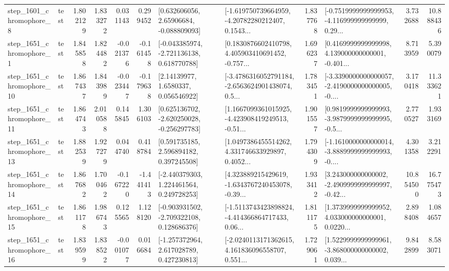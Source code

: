 \begin{tabular}{llrrrrllrlrr}
  step\_1601\_chromophore\_8 &      test &      1.802129 &    1.833272 &      0.031143 &  0.299452 &     [0.632606056, 2.65906684, -0.088809093] &  [-1.619750739664959, -4.20782280212407, 0.1543... &       1.837768 &  [-0.7519999999999953, -4.116999999999999, 0.29... &            3.732688 &         10.888436 \\
  step\_1651\_chromophore\_1 &      test &      1.845858 &    1.824482 &     -0.021376 & -0.161458 &   [-0.043385974, -2.721136138, 0.618770788] &  [0.1830876602410798, 4.405903410691452, -0.757... &       1.696237 &  [0.4169999999999998, 4.139000000000001, -0.401... &            8.713959 &          5.390079 \\
 step\_1651\_chromophore\_10 &      test &      1.867437 &    1.843989 &     -0.023447 & -0.179638 &        [2.14139977, 1.6580337, 0.056546922] &  [-3.4786316052791184, -2.6563624901438074, 0.5... &       1.783451 &  [-3.3390000000000057, -2.4190000000000005, -0.... &            3.170418 &         11.333621 \\
 step\_1651\_chromophore\_11 &      test &      1.864743 &    2.010588 &      0.145845 &  1.306103 &   [0.625136702, -2.620250028, -0.256297783] &  [1.1667099361015925, -4.423908419249513, -0.51... &       1.901557 &  [0.9819999999999993, -3.9879999999999995, -0.5... &            2.770527 &          1.933169 \\
 step\_1651\_chromophore\_13 &      test &      1.882539 &    1.927279 &      0.044740 &  0.418784 &     [0.591735185, 2.596894182, 0.397245508] &  [1.0497386455514262, 4.331746633929897, 0.4052... &       1.794309 &  [-1.1610000000000014, -3.8889999999999993, -0.... &            4.301358 &          3.212291 \\
 step\_1651\_chromophore\_14 &      test &      1.867682 &    1.700462 &     -0.167220 & -1.441413 &    [-2.440379303, 1.224461564, 0.249728253] &  [4.323889215429619, -1.6343767240453078, -0.39... &       1.933412 &  [3.243000000000002, -2.4909999999999997, -0.42... &           10.854500 &         16.775473 \\
 step\_1651\_chromophore\_15 &      test &      1.861178 &    1.986743 &      0.125565 &  1.128120 &   [-0.903931502, -2.709322108, 0.128686376] &  [-1.5113743423898824, -4.414366864717433, 0.06... &       1.811175 &  [1.3739999999999952, 4.033000000000001, 0.0220... &            2.898408 &          1.084657 \\
 step\_1651\_chromophore\_16 &      test &      1.839599 &    1.838522 &     -0.001077 &  0.016684 &    [-1.257372964, 2.617028789, 0.427230813] &  [-2.0240113171362615, 4.161836096558707, 0.551... &       1.729061 &  [1.5229999999999961, -3.868000000000002, 0.039... &            9.842899 &          8.583071 \\

\end{tabular}
